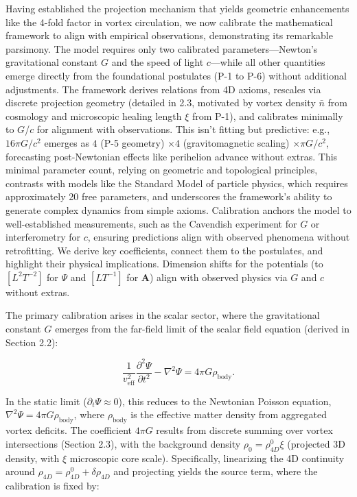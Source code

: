 Having established the projection mechanism that yields geometric enhancements like the 4-fold factor in vortex circulation, we now calibrate the mathematical framework to align with empirical observations, demonstrating its remarkable parsimony. The model requires only two calibrated parameters---Newton's gravitational constant $G$ and the speed of light $c$---while all other quantities emerge directly from the foundational postulates (P-1 to P-6) without additional adjustments. The framework derives relations from 4D axioms, rescales via discrete projection geometry (detailed in 2.3, motivated by vortex density $\bar{n}$ from cosmology and microscopic healing length $\xi$ from P-1), and calibrates minimally to $G$/$c$ for alignment with observations. This isn't fitting but predictive: e.g., $16\pi G/c^2$ emerges as $4$ (P-5 geometry) $\times 4$ (gravitomagnetic scaling) $\times \pi G/c^2$, forecasting post-Newtonian effects like perihelion advance without extras. This minimal parameter count, relying on geometric and topological principles, contrasts with models like the Standard Model of particle physics, which requires approximately 20 free parameters, and underscores the framework's ability to generate complex dynamics from simple axioms. Calibration anchors the model to well-established measurements, such as the Cavendish experiment for $G$ or interferometry for $c$, ensuring predictions align with observed phenomena without retrofitting. We derive key coefficients, connect them to the postulates, and highlight their physical implications. Dimension shifts for the potentials (to $[L^2 T^{-2}]$ for $\Psi$ and $[L T^{-1}]$ for $\mathbf{A}$) align with observed physics via $G$ and $c$ without extras.

The primary calibration arises in the scalar sector, where the gravitational constant $G$ emerges from the far-field limit of the scalar field equation (derived in Section 2.2):

\[
\frac{1}{v_{\text{eff}}^2} \frac{\partial^2 \Psi}{\partial t^2} - \nabla^2 \Psi = 4\pi G \rho_{\text{body}}.
\]

In the static limit ($\partial_t \Psi \approx 0$), this reduces to the Newtonian Poisson equation, $\nabla^2 \Psi = 4\pi G \rho_{\text{body}}$, where $\rho_{\text{body}}$ is the effective matter density from aggregated vortex deficits. The coefficient $4\pi G$ results from discrete summing over vortex intersections (Section 2.3), with the background density $\rho_0 = \rho_{4D}^0 \xi$ (projected 3D density, with $\xi$ microscopic core scale). Specifically, linearizing the 4D continuity around $\rho_{4D} = \rho_{4D}^0 + \delta \rho_{4D}$ and projecting yields the source term, where the calibration is fixed by:

